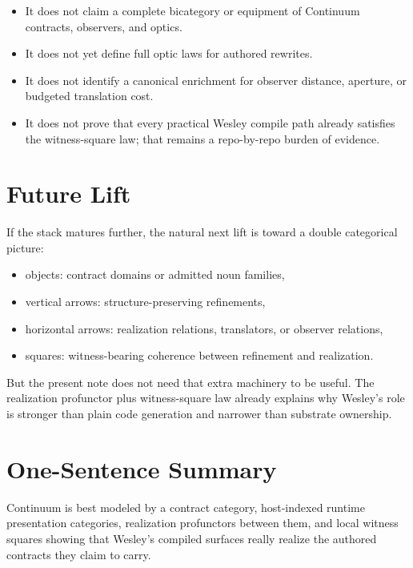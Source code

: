 \documentclass[11pt]{article}
\theoremstyle{definition}
\begin{document}
\begin{itemize}[leftmargin=2em]
\item It does not claim a complete bicategory or equipment of Continuum
  contracts, observers, and optics.
\item It does not yet define full optic laws for authored rewrites.
\item It does not identify a canonical enrichment for observer distance,
  aperture, or budgeted translation cost.
\item It does not prove that every practical Wesley compile path already
  satisfies the witness-square law; that remains a repo-by-repo burden of
  evidence.
\end{itemize}

\section{Future Lift}

If the stack matures further, the natural next lift is toward a double
categorical picture:
\begin{itemize}[leftmargin=2em]
\item objects: contract domains or admitted noun families,
\item vertical arrows: structure-preserving refinements,
\item horizontal arrows: realization relations, translators, or observer
  relations,
\item squares: witness-bearing coherence between refinement and realization.
\end{itemize}

But the present note does not need that extra machinery to be useful. The
realization profunctor plus witness-square law already explains why Wesley's
role is stronger than plain code generation and narrower than substrate
ownership.

\section{One-Sentence Summary}

Continuum is best modeled by a contract category, host-indexed runtime
presentation categories, realization profunctors between them, and local
witness squares showing that Wesley's compiled surfaces really realize the
authored contracts they claim to carry.
\end{document}
